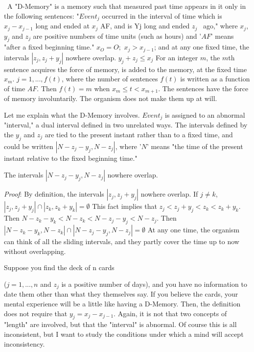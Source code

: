 \documentclass[10pt,twoside,draft]{memoir}
\newcommand{\less}{<}
\begin{document}
{{\ A "D-Memory" is a memory such that measured past time 
appears in it only in the following sentences: "$Event_j$ occurred in the interval 
of time which is $x_j-x_{j-1}$ long and ended at $x_j$ AF, and is Yj long and ended $z_j$
\ ago," where $x_j$, $y_j$ and $z_j$ are positive numbers of time units (such as hours) 
and '$AF$' means "after a fixed beginning time." $x_O=O;$ $x_j> x_{j-1}$; and at any 
one fixed time, the intervals $|z_j, z_j+y_j|$ nowhere overlap. $y_j+z_j\leq x_j$ For an
integer $m$, the $m$th sentence acquires the force of memory, is added to the 
memory, at the fixed time $x_m$. $j=1, ..., f(t)$, where the number of sentences 
$f(t)$ is written as a function of time $AF$. Then $f(t)=m$ when $x_m \leq t \less x_{m+1}$. 
The sentences have the force of memory involuntarily. The organism does 
not make them up at will. 

Let me explain what the D-Memory involves. $Event_j$ is assigned to an 
abnormal "interval," a dual interval defined in two unrelated ways. The 
intervals defined by the $y_j$ and $z_j$ are tied to the present instant rather than to 
a fixed time, and could be written $|N-z_j-y_j, N-z_j|$, where '$N$' means "the time 
of the present instant relative to the fixed beginning time." 

\newcommand{\proof}{\textit{Proof}}

 The intervals $|N-z_j-y_j, N-z_j|$ nowhere overlap. 

\proof: By definition, the intervals $|z_j, z_j+y_j|$ nowhere overlap. If $j\neq k$,
$|z_j, z_j+y_j|\cap|z_k, z_k+y_k|=\emptyset$ 
This fact implies that \eg $z_j\less z_j+y_j\less z_k\less z_k+y_k$.
Then $N-z_k-y_k\less N-z_k\less N-z_j-y_j\less N-z_j$.
Then $|N-z_k-y_k, N-z_k|\cap|N-z_j-y_j, N-z_j|=\emptyset$
At any one time, the organism can think of all the sliding intervals, and they 
partly cover the time up to now without overlapping. 

Suppose you find the deck of n cards 

{ \centering
{}}


($j=1,...,n$ and $z_j$ is a positive number of days), and you have no 
information to date them other than what they themselves say. If you 
believe the cards, your mental experience will be a little like having a 
D-Memory. Then, the definition does not require that $y_j=x_j-x_{j-1}$. Again, it is 
not that two concepts of "length" are involved, but that the "interval" is 
abnormal. Of course this is all inconsistent, but I want to study the 
conditions under which a mind will accept inconsistency. 

}}
\end{document}
